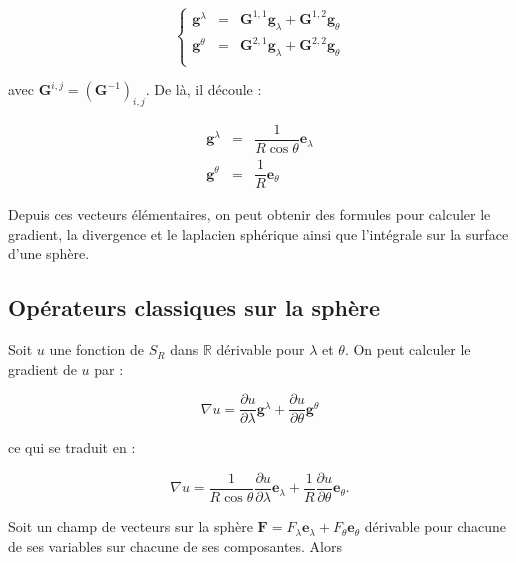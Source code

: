 \begin{equation}
\left\lbrace 
\begin{array}{rcl}
\mathbf{g}^{\lambda} & = & \mathbf{G}^{1,1} \mathbf{g}_{\lambda} + \mathbf{G}^{1,2} \mathbf{g}_{\theta} \\
\mathbf{g}^{\theta} & = & \mathbf{G}^{2,1} \mathbf{g}_{\lambda} + \mathbf{G}^{2,2} \mathbf{g}_{\theta} \\
\end{array}
\right.
\end{equation}

avec $\mathbf{G}^{i,j} = \left( \mathbf{G}^{-1} \right)_{i,j}$.
De là, il découle :

\begin{equation}
\begin{array}{rcl}
\mathbf{g}^{\lambda} & = & \dfrac{1}{R \cos \theta}  \mathbf{e}_{\lambda} \\
\mathbf{g}^{\theta} & = & \dfrac{1}{R} \mathbf{e}_{\theta}
\end{array}
\end{equation}

Depuis ces vecteurs élémentaires, on peut obtenir des formules pour calculer le gradient, la divergence et le laplacien sphérique ainsi que l'intégrale sur la surface d'une sphère.

\subsection{Opérateurs classiques sur la sphère}

Soit $u$ une fonction de $S_R$ dans $\mathbb{R}$ dérivable pour $\lambda$ et $\theta$. On peut calculer le gradient de $u$ par :

\begin{equation}
\nabla u = \dfrac{\partial u}{\partial \lambda} \mathbf{g}^{\lambda} + \dfrac{\partial u}{\partial \theta} \mathbf{g}^{\theta}
\end{equation}

ce qui se traduit en :

\begin{equation}\label{gradient_lonlat}
\nabla u = \dfrac{1}{R \cos \theta}\dfrac{\partial u}{\partial \lambda} \mathbf{e}_{\lambda} + \dfrac{1}{R} \dfrac{\partial u}{\partial \theta} \mathbf{e}_{\theta}.
\end{equation}

Soit un champ de vecteurs sur la sphère $\mathbf{F} = F_{\lambda} \mathbf{e}_{\lambda} + F_{\theta} \mathbf{e}_{\theta}$ dérivable pour chacune de ses variables sur chacune de ses composantes. Alors 

